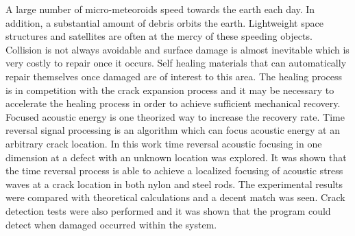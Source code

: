 A large number of micro-meteoroids speed towards the earth each day. In addition, a substantial amount of debris orbits the earth. Lightweight space structures and satellites are often at the mercy of these speeding objects. Collision is not always avoidable and surface damage is almost inevitable which is very costly to repair once it occurs. Self healing materials that can automatically repair themselves once damaged are of interest to this area. The healing process is in competition with the crack expansion process and it may be necessary to accelerate the healing process in order to achieve sufficient mechanical recovery. Focused acoustic energy is one theorized way to increase the recovery rate. Time reversal signal processing is an algorithm which can focus acoustic energy at an arbitrary crack location. In this work time reversal acoustic focusing in one dimension at a defect with an unknown location was explored. It was shown that the time reversal process is able to achieve a localized focusing of acoustic stress waves at a crack location in both nylon and steel rods. The experimental results were compared with theoretical calculations and a decent match was seen. Crack detection tests were also performed and it was shown that the program could detect when damaged occurred within the system.

